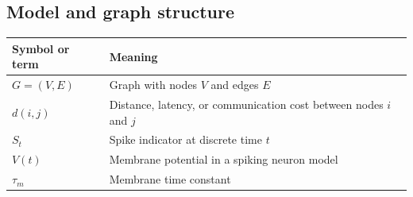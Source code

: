 \subsection*{Model and graph structure}

\begin{tabularx}{\textwidth}{@{}p{}X@{}}
  \toprule
  \textbf{Symbol or term} & \textbf{Meaning} \\
  \midrule
  \(G=(V,E)\) & Graph with nodes \(V\) and edges \(E\) \\
  \(d(i,j)\) & Distance, latency, or communication cost between nodes \(i\) and \(j\) \\
  \(S_t\) & Spike indicator at discrete time \(t\) \\
  \(V(t)\) & Membrane potential in a spiking neuron model \\
  \(\tau_m\) & Membrane time constant \\
  \bottomrule
\end{tabularx}
